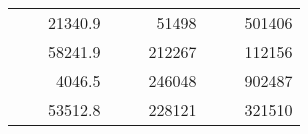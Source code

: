 \begin{table}[H]
\begin{tabular}{|ccrccrccc}
\rowcolor[HTML]{DDFDFF} 
\multicolumn{1}{|c|}{\cellcolor[HTML]{FFFFC7}}                                & \multicolumn{1}{c|}{\cellcolor[HTML]{DDFDFF}}                      & \multicolumn{1}{r|}{\cellcolor[HTML]{DAE8FC}21340.9}   & \multicolumn{1}{c|}{\cellcolor[HTML]{FFFFC7}}                                & \multicolumn{1}{c|}{\cellcolor[HTML]{DDFDFF}}                       & \multicolumn{1}{r|}{\cellcolor[HTML]{DDFDFF}51498}     & \multicolumn{1}{c|}{\cellcolor[HTML]{FFFFC7}}                                & \multicolumn{1}{c|}{\cellcolor[HTML]{DDFDFF}}                      & \multicolumn{1}{r|}{\cellcolor[HTML]{DDFDFF}501406}    \\ \cline{3-3} \cline{6-6} \cline{9-9} 
\multicolumn{1}{|c|}{\cellcolor[HTML]{FFFFC7}}                                & \multicolumn{1}{c|}{\cellcolor[HTML]{DDFDFF}}                      & \multicolumn{1}{r|}{\cellcolor[HTML]{DDFDFF}58241.9}   & \multicolumn{1}{c|}{\cellcolor[HTML]{FFFFC7}}                                & \multicolumn{1}{c|}{\cellcolor[HTML]{DDFDFF}}                       & \multicolumn{1}{r|}{\cellcolor[HTML]{DAE8FC}212267}    & \multicolumn{1}{c|}{\cellcolor[HTML]{FFFFC7}}                                & \multicolumn{1}{c|}{\cellcolor[HTML]{DDFDFF}}                      & \multicolumn{1}{r|}{\cellcolor[HTML]{DAE8FC}112156}    \\ \cline{3-3} \cline{6-6} \cline{9-9} 
\rowcolor[HTML]{DDFDFF} 
\multicolumn{1}{|c|}{\cellcolor[HTML]{FFFFC7}}                                & \multicolumn{1}{c|}{\cellcolor[HTML]{DDFDFF}}                      & \multicolumn{1}{r|}{\cellcolor[HTML]{DAE8FC}4046.5}    & \multicolumn{1}{c|}{\cellcolor[HTML]{FFFFC7}}                                & \multicolumn{1}{c|}{\cellcolor[HTML]{DDFDFF}}                       & \multicolumn{1}{r|}{\cellcolor[HTML]{DDFDFF}246048}    & \multicolumn{1}{c|}{\cellcolor[HTML]{FFFFC7}}                                & \multicolumn{1}{c|}{\cellcolor[HTML]{DDFDFF}}                      & \multicolumn{1}{r|}{\cellcolor[HTML]{DDFDFF}902487}    \\ \cline{3-3} \cline{6-6} \cline{9-9} 
\multicolumn{1}{|c|}{\cellcolor[HTML]{FFFFC7}}                                & \multicolumn{1}{c|}{\cellcolor[HTML]{DDFDFF}}                      & \multicolumn{1}{r|}{\cellcolor[HTML]{DDFDFF}53512.8}   & \multicolumn{1}{c|}{\cellcolor[HTML]{FFFFC7}}                                & \multicolumn{1}{c|}{\cellcolor[HTML]{DDFDFF}}                       & \multicolumn{1}{r|}{\cellcolor[HTML]{DAE8FC}228121}    & \multicolumn{1}{c|}{\cellcolor[HTML]{FFFFC7}}                                & \multicolumn{1}{c|}{\cellcolor[HTML]{DDFDFF}}                      & \multicolumn{1}{r|}{\cellcolor[HTML]{DAE8FC}321510}    \\ \cline{3-3} \cline{6-6} \cline{9-9} 

\end{tabular}
\end{table}
